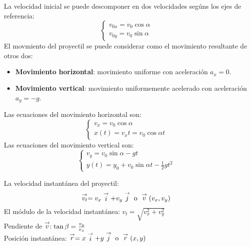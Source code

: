 La velocidad inicial se puede descomponer en dos velocidades segúns los ejes de referencia:
$$\begin{cases}
    v_{0x} = v_0 \cos \alpha \\
    v_{0y} = v_0 \sin \alpha
\end{cases}$$
El movmiento del proyectil se puede considerar como el movimiento resultante de otros dos:
\begin{itemize}
    \item \textbf{Movimiento horizontal}: movimiento uniforme con aceleración $a_x = 0$.
    \item \textbf{Movimiento vertical}: movimiento uniformemente acelerado con aceleración $a_y = -g$.
\end{itemize}
Las ecuaciones del movimiento horizontal son:
$$\begin{cases}
    v_x = v_0 \cos \alpha\\
    x(t) = v_x t = v_0 \cos \alpha t
\end{cases}$$
Las ecuaciones del movimiento vertical son:
$$\begin{cases}
    v_y = v_0 \sin \alpha - gt\\
    y(t) = y_0 + v_0 \sin \alpha t - \frac{1}{2}gt^2
\end{cases}$$

La velocidad instantánea del proyectil:
$$\stackrel{\to}{v_t} = v_x\stackrel{\to}{i} + v_y\stackrel{\to}{j} \text{  o  } \stackrel{\to}{v}(v_x,v_y)$$
El módulo de la velocidad instantánea: $v_t = \sqrt{v_x^2 + v_y^2}$\\
Pendiente de $\stackrel{\to}{v} : \tan \beta = \frac{v_y}{v_x}$\\
Posición instantánea: $\stackrel{\to}{r} = x\stackrel{\to}{i} + y\stackrel{\to}{j} \text{  o  } \stackrel{\to}{r}(x,y)$\\

